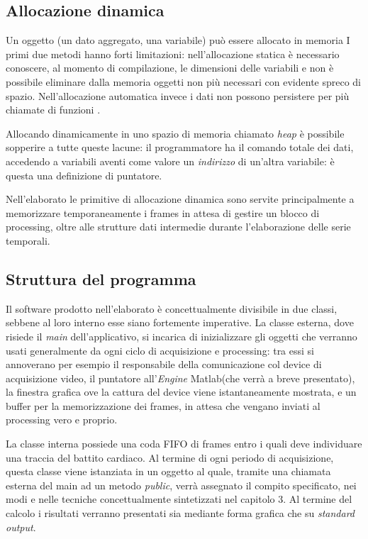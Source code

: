 	\subsection{Allocazione dinamica} %
Un oggetto (un dato aggregato, una variabile) può essere allocato in memoria 
I primi due metodi hanno forti limitazioni: nell'allocazione statica è necessario conoscere, al momento di compilazione, le dimensioni delle variabili e non è possibile eliminare dalla memoria oggetti non più necessari con evidente spreco di spazio. Nell'allocazione automatica invece i dati non possono persistere per più chiamate di funzioni \cite{WIKI}.

Allocando dinamicamente in uno spazio di memoria chiamato {\em heap} è possibile sopperire a tutte queste lacune: il programmatore ha il comando totale dei dati, accedendo a variabili aventi come valore un {\em indirizzo} di un'altra variabile: è questa una definizione di puntatore.

Nell'elaborato le primitive di allocazione dinamica sono servite principalmente a memorizzare temporaneamente i frames in attesa di gestire un blocco di processing, oltre alle strutture dati intermedie durante l'elaborazione delle serie temporali.
	\subsection{Struttura del programma} %
Il software prodotto nell'elaborato è concettualmente divisibile in due classi, sebbene al loro interno esse siano fortemente imperative. La classe esterna, dove risiede il {\em main} dell'applicativo, si incarica di inizializzare gli oggetti che verranno usati generalmente da ogni ciclo di acquisizione e processing: tra essi si annoverano per esempio il responsabile della comunicazione col device di acquisizione video, il puntatore all'{\em Engine} Matlab\rtm (che verrà a breve presentato), la finestra grafica ove la cattura del device viene istantaneamente mostrata, e un buffer per la memorizzazione dei frames, in attesa che vengano inviati al processing vero e proprio.

La classe interna possiede una coda FIFO di  frames entro i quali deve individuare una traccia del battito cardiaco. Al termine di ogni periodo di acquisizione, questa classe viene istanziata in un oggetto al quale, tramite una chiamata esterna del main ad un metodo {\em public}, verrà assegnato il compito specificato, nei modi e nelle tecniche concettualmente sintetizzati nel capitolo 3. Al termine del calcolo i risultati verranno presentati sia mediante forma grafica che su {\em standard output}.
